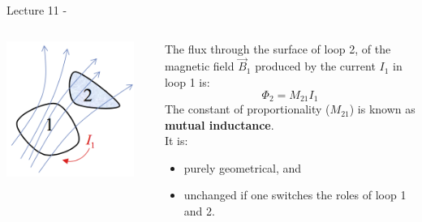 
\renewcommand{\summarizedlecture}{11 }

%
%
%

\begin{frame}{Lecture \summarizedlecture - \lecturesummarytitle}

\begin{columns}
  \begin{column}{0.25\textwidth}
    \begin{center}
       \includegraphics[width=0.90\textwidth]{./images/schematics/mutual_inductance_1.png}\\
     \end{center}
  \end{column}
  \begin{column}{0.75\textwidth}
  {\scriptsize
       The flux through the surface of loop 2, of the magnetic field $\vec{B}_1$
       produced by the current $I_1$ in loop 1 is:
       \begin{equation*}
            \Phi_2 = M_{21}  I_1
       \end{equation*}
       The constant of proportionality ($M_{21}$) is known as {\bf mutual inductance}.\\
       It is:
       \begin{itemize}
           \item purely geometrical, and
           \item unchanged if one switches the roles of loop 1 and 2.\\
       \end{itemize}
   }
  \end{column}
\end{columns}


\end{frame}
